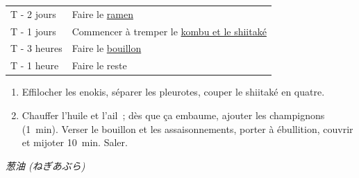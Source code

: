 


\begin{tabular}{|l|l|}
  T - 2 jours & Faire le \hyperref[ラーメン]{ramen} \\
  T - 1 jours & Commencer à tremper le \hyperref[bouillon-legumes]{kombu et le shiitaké} \\
  T - 3 heures & Faire le \hyperref[bouillon-legumes]{bouillon} \\
  T - 1 heure & Faire le reste \\
\end{tabular}




\begin{ingredients}
   
   
   
\end{ingredients}

\begin{recipe}
  \begin{enumerate}

  \item Effilocher les enokis, séparer les pleurotes, couper le
    shiitaké en quatre.

  \item Chauffer l'huile et l'ail~; dès que ça embaume, ajouter les
    champignons (1~min). Verser le bouillon et les assaisonnements,
    porter à ébullition, couvrir et mijoter 10~min. Saler.

  \end{enumerate}
\end{recipe}



\textit{葱油 (ねぎあぶら)}

\begin{ingredients}
\end{ingredients}

